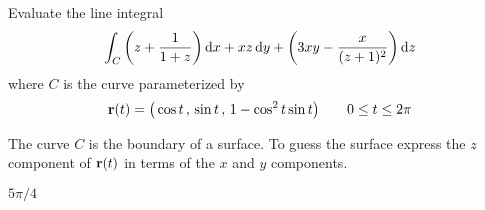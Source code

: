 \begin{question}[M317 2009A] %
Evaluate the line integral
\begin{equation*}
\int_C\left(z+\frac{1}{1+z}\right)\mathrm{d}x
         +xz\,\mathrm{d}y
         +\left(3xy-\frac{x}{(z+1)^2}\right)\mathrm{d}z
\end{equation*}
where $C$ is the curve parameterized by
\begin{equation*}
\mathbf{r}(t) = \big(\cos t\,,\, \sin t\,,\, 1 - \cos^2 t \sin t\big)\qquad
0 \le t \le 2\pi
\end{equation*}
\end{question}

\begin{hint} 
The curve $C$ is the boundary of a surface. To guess the surface
express the $z$ component of $\mathbf{r}(t)$ in terms of the $x$ and $y$ components.
\end{hint}

\begin{answer} 
$5\pi/4$
\end{answer}


